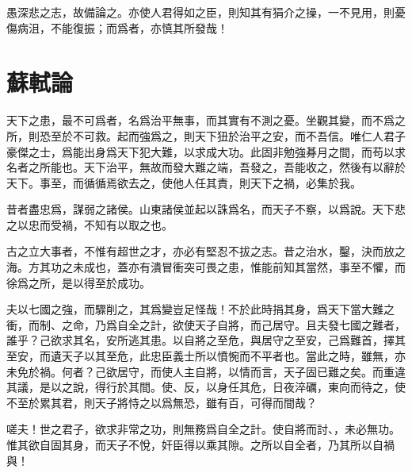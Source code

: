 愚深悲之志，故備論之。亦使人君得如之臣，則知其有狷介之操，一不見用，則憂傷病沮，不能復振；而爲者，亦慎其所發哉！%

\theendnotes

\section[鼂錯論\quad{\small 蘇軾}]{{\normalsize 蘇軾}\quad{}論}
天下之患，最不可爲者，名爲治平無事，而其實有不測之憂。坐觀其變，而不爲之所，則恐至於不可救。起而強爲之，則天下狃於治平之安，而不吾信。唯仁人君子豪傑之士，爲能出身爲天下犯大難，以求成大功。此固非勉強朞月之間，而苟以求名者之所能也。天下治平，無故而發大難之端，吾發之，吾能收之，然後有{以}辭於天下。事至，而循循焉欲去之，使他人任其責，則天下之禍，必集於我。%

昔者盡忠爲，謀弱之諸侯。山東諸侯並起以誅爲名，而天子不察，以爲說。天下悲之以忠而受禍，不知有以取之也。%

古之立大事者，不惟有超世之才，亦必有堅忍不拔之志。昔之治水，鑿，決而放之海。方其功之未成也，蓋亦有潰冒衝突可畏之患，惟能前知其當然，事至不懼，而徐爲之所，是以得至於成功。%

夫以七國之強，而驟削之，其爲變豈足怪哉！不於此時捐其身，爲天下當大難之衝，而制、之命，乃爲自全之計，欲使天子自將，而己居守。且夫發七國之難者，誰乎？己欲求其名，安所逃其患。以自將之至危，與居守之至安，己爲難首，擇其至安，而遺天子以其至危，此忠臣義士所以憤惋而不平者也。當此之時，雖無，亦未免於禍。何者？己欲居守，而使人主自將，以情而言，天子固已難之矣。而重違其議，是以之說，得行於其間。使、反，以身任其危，日夜淬礪，東向而待之，使不至於累其君，則天子將恃之以爲無恐，雖有百，可得而間哉？%

嗟夫！世之君子，欲求非常之功，則無務爲自全之計。使自將而討、，未必無功。惟其欲自固其身，而天子不悅，奸臣得以乘其隙。之所以自全者，乃其所以自禍與！

\theendnotes

